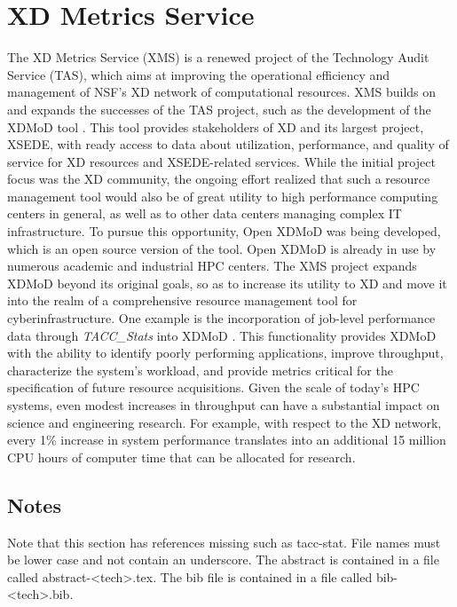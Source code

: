 \section{XD Metrics Service}

The XD Metrics Service (XMS) \cite{xms-vonLaszewski15tas} is a renewed
project of the Technology Audit Service (TAS), which aims at improving
the operational efficiency and management of NSF's XD network of
computational resources. XMS builds on and expands the successes of
the TAS project, such as the development of the XDMoD tool
. This tool provides stakeholders of XD and its largest
project, XSEDE, with ready access to data about utilization,
performance, and quality of service for XD resources and XSEDE-related
services. While the initial project focus was the XD community, the
ongoing effort realized that such a resource management tool would
also be of great utility to high performance computing centers in
general, as well as to other data centers managing complex IT
infrastructure. To pursue this opportunity, Open XDMoD was being
developed, which is an open source version of the tool. Open XDMoD is
already in use by numerous academic and industrial HPC centers. The
XMS project expands XDMoD beyond its original goals, so as to increase
its utility to XD and move it into the realm of a comprehensive
resource management tool for cyberinfrastructure. One example is the
incorporation of job-level performance data through {\em TACC\_Stats}
into XDMoD . This functionality provides XDMoD with
the ability to identify poorly performing applications, improve
throughput, characterize the system's workload, and provide metrics
critical for the specification of future resource acquisitions. Given
the scale of today's HPC systems, even modest increases in throughput
can have a substantial impact on science and engineering research. For
example, with respect to the XD network, every 1\% increase in system
performance translates into an additional 15 million CPU hours of
computer time that can be allocated for research.

\subsection{Notes}

Note that this section has references missing such as tacc-stat. File
names must be lower case and not contain an underscore. The abstract
is contained in a file called abstract-<tech>.tex. The bib file is
contained in a file called bib-<tech>.bib.

